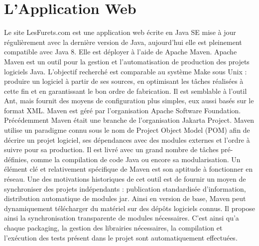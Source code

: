 \section{L'Application Web}
Le site LesFurets.com est une application web écrite en Java SE mise à jour régulièrement avec la dernière version de Java, aujourd'hui elle est pleinement compatible avec Java 8. Elle est déployer à l'aide de Apache Maven. Apache Maven est un outil pour la gestion et l'automatisation de production des projets logiciels Java. L'objectif recherché est comparable au système Make sous Unix : produire un logiciel à partir de ses sources, en optimisant les tâches réalisées à cette fin et en garantissant le bon ordre de fabrication.
Il est semblable à l'outil Ant, mais fournit des moyens de configuration plus simples, eux aussi basés sur le format XML. Maven est géré par l'organisation Apache Software Foundation. Précédemment Maven était une branche de l'organisation Jakarta Project.
Maven utilise un paradigme connu sous le nom de Project Object Model (POM) afin de décrire un projet logiciel, ses dépendances avec des modules externes et l'ordre à suivre pour sa production. Il est livré avec un grand nombre de tâches pré-définies, comme la compilation de code Java ou encore sa modularisation.
Un élément clé et relativement spécifique de Maven est son aptitude à fonctionner en réseau. Une des motivations historiques de cet outil est de fournir un moyen de synchroniser des projets indépendants : publication standardisée d'information, distribution automatique de modules jar. Ainsi en version de base, Maven peut dynamiquement télécharger du matériel sur des dépôts logiciels connus. Il propose ainsi la synchronisation transparente de modules nécessaires. C'est ainsi qu'a chaque packaging, la gestion des librairies nécessaires, la compilation et l'exécution des tests présent dans le projet sont automatiquement effectuées.